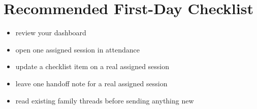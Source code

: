 \documentclass[11pt]{article}
\begin{document}
\section*{Recommended First-Day Checklist}
\begin{itemize}
  \item review your dashboard
  \item open one assigned session in attendance
  \item update a checklist item on a real assigned session
  \item leave one handoff note for a real assigned session
  \item read existing family threads before sending anything new
\end{itemize}
\end{document}
